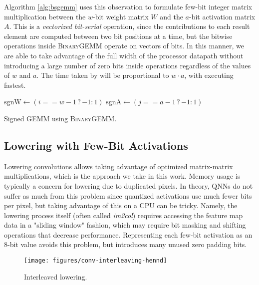 \documentclass[sigconf]{acmart}
\begin{document}
Algorithm \ref{alg:bsgemm} uses this observation to formulate few-bit integer matrix multiplication between the $w$-bit weight matrix $W$ and the $a$-bit activation matrix $A$.
This is a \emph{vectorized bit-serial} operation, since the contributions to each result element are computed between two bit positions at a time, but the bitwise operations inside \textsc{BinaryGEMM} operate on vectors of bits.
In this manner, we are able to take advantage of the full width of the processor datapath without introducing a large number of zero bits inside operations regardless of the values of $w$ and $a$.
The time taken by \ours{} will be proportional to $w \cdot a$, with  executing fastest.

\begin{algorithm}[t]
	\centering
	\footnotesize
	\begin{algorithmic}
		\algrenewcommand\algorithmicindent{1.0em}%
		\State $\mathrm{sgnW} \gets (i == w-1 \mathrel{?} -1 : 1)$
		\State $\mathrm{sgnA} \gets (j == a-1 \mathrel{?} -1 : 1)$
		\State {}
		\EndFor
		\EndFor
		\EndFunction
	\end{algorithmic}
	\caption{Signed  GEMM using \textsc{BinaryGEMM}.}
	\label{alg:bsgemm}
\end{algorithm}


\subsection{Lowering with Few-Bit Activations}
Lowering convolutions \cite{convlowering} allows taking advantage of optimized matrix-matrix multiplications, which is the approach we take in this work.
Memory usage is typically a concern for lowering due to duplicated pixels.
In theory, QNNs do not suffer as much from this problem since quantized activations use much fewer bits per pixel, but taking advantage of this on a CPU can be tricky.
Namely, the lowering process itself (often called \emph{im2col}) requires accessing the feature map data in a "sliding window" fashion, which may require bit masking and shifting operations that decrease performance.
Representing each few-bit activation as an 8-bit value avoids this problem, but introduces many unused zero padding bits.
\begin{figure}
	\texttt{[image: figures/conv-interleaving-hennd]}
	\caption{Interleaved lowering.}
	\label{fig:interleaved}
\end{figure}
\end{document}
